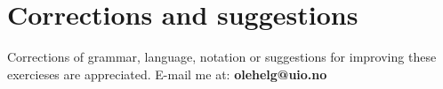 \documentclass{article}           %
\newcommand\marginsymbol[1][0pt]{%
  \tabto*{0cm}\makebox[\dimexpr-1cm-#1\relax][r]{$\mathbb{P}$}\tabto*{\TabPrevPos}}
\begin{document}
\begin{comment}
\subsection{Probability of survival}
If a (4, 8) ES had been used in Problem 3a, what would the probability of
the optimal solution (\(x = 4\)) surviving the first generation have been?
\subsection{Comparison \marginsymbol}
Repeat Problem 3a with an EP with \(q = 2\). How do the two algorithms compare?
\end{comment}
\section*{Corrections and suggestions}
Corrections of grammar, language, notation or suggestions for improving these
exercieses are appreciated. E-mail me at: \textbf{olehelg@uio.no}
\end{document}
